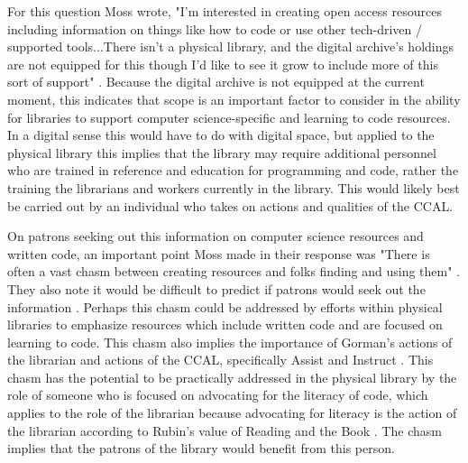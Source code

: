 For this question Moss wrote, "I'm interested in creating open access resources including information on things like how to code or use other tech-driven / supported tools...There isn't a physical library, and the digital archive's holdings are not equipped for this though I'd like to see it grow to include more of this sort of support" \cite{elaeinterview}. Because the digital archive is not equipped at the current moment, this indicates that scope is an important factor to consider in the ability for libraries to support computer science-specific and learning to code resources. In a digital sense this would have to do with digital space, but applied to the physical library this implies that the library may require additional personnel who are trained in reference and education for programming and code, rather the training the librarians and workers currently in the library. This would likely best be carried out by an individual who takes on actions and qualities of the CCAL. 

On patrons seeking out this information on computer science resources and written code, an important point Moss made in their response was "There is often a vast chasm between creating resources and folks finding and using them" \cite{elaeinterview}. They also note it would be difficult to predict if patrons would seek out the information \cite{elaeinterview}. Perhaps this chasm could be addressed by efforts within physical libraries to emphasize resources which include written code and are focused on learning to code. This chasm also implies the importance of Gorman's actions of the librarian and actions of the CCAL, specifically Assist and Instruct \cite{gorman2000values}. This chasm has the potential to be practically addressed in the physical library by the role of someone who is focused on advocating for the literacy of code, which applies to the role of the librarian because advocating for literacy is the action of the librarian according to Rubin's value of Reading and the Book \cite{rubin2016foundationslis}. The chasm implies that the patrons of the library would benefit from this person. 

